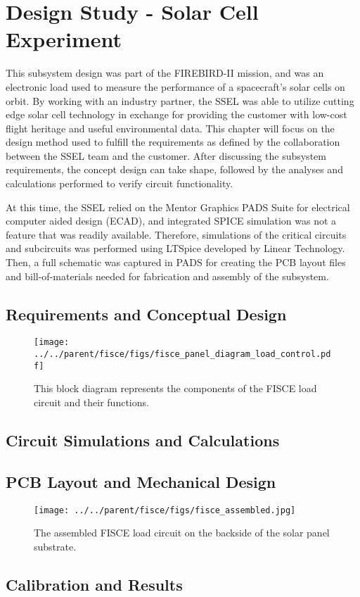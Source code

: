 \chapter{Design Study - Solar Cell Experiment}\label{CH:Design1}
This subsystem design was part of the FIREBIRD-II mission, and was an electronic load used to measure the performance of a spacecraft's solar cells on orbit. By working with an industry partner, the SSEL was able to utilize cutting edge solar cell technology in exchange for providing the customer with low-cost flight heritage and useful environmental data. This chapter will focus on the design method used to fulfill the requirements as defined by the collaboration between the SSEL team and the customer. After discussing the subsystem requirements, the concept design can take shape, followed by the analyses and calculations performed to verify circuit functionality. 

At this time, the SSEL relied on the Mentor Graphics PADS Suite for electrical computer aided design (ECAD), and integrated SPICE simulation was not a feature that was readily available. Therefore, simulations of the critical circuits and subcircuits was performed using LTSpice developed by Linear Technology. Then, a full schematic was captured in PADS for creating the PCB layout files and bill-of-materials needed for fabrication and assembly of the subsystem. 

\section{Requirements and Conceptual Design}\label{Sect:test}



\begin{figure}[htbp]
	\centering
	\texttt{[image: ../../parent/fisce/figs/fisce\_panel\_diagram\_load\_control.pdf]}
	\caption{This block diagram represents the components of the FISCE load circuit and their functions.}
	\label{fig:plot}
\end{figure}



\section{Circuit Simulations and Calculations}\label{Sect:test}



\section{PCB Layout and Mechanical Design}\label{Sect:test}

\begin{figure}[htbp]
	\centering
	\texttt{[image: ../../parent/fisce/figs/fisce\_assembled.jpg]}
	\caption{The assembled FISCE load circuit on the backside of the solar panel substrate.}
	\label{fig:photo}
\end{figure}

\section{Calibration and Results}\label{Sect:test}
